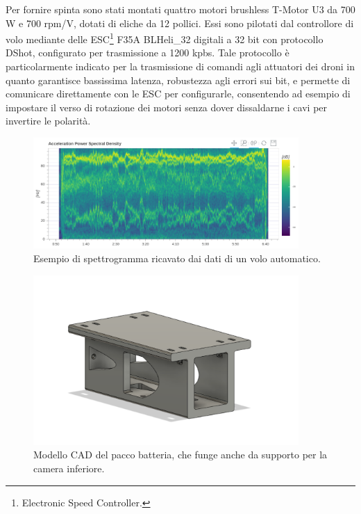 Per fornire spinta sono stati montati quattro motori brushless T-Motor U3 da 700 W e 700 rpm/V, dotati di eliche da 12 pollici. Essi sono pilotati dal controllore di volo mediante delle ESC\footnote{Electronic Speed Controller.} F35A BLHeli\_32 digitali a 32 bit con protocollo DShot, configurato per trasmissione a 1200 kpbs. Tale protocollo è particolarmente indicato per la trasmissione di comandi agli attuatori dei droni in quanto garantisce bassissima latenza, robustezza agli errori sui bit, e permette di comunicare direttamente con le ESC per configurarle, consentendo ad esempio di impostare il verso di rotazione dei motori senza dover dissaldarne i cavi per invertire le polarità.\vfill\clearpage

\begin{figure}
    \centering
    \includegraphics[width=0.9\textwidth]{figs/chapter3/flight_spectro.png}
    \caption{Esempio di spettrogramma ricavato dai dati di un volo automatico.}
    \label{fig:flightspec}
\end{figure}

\begin{figure}
    \centering
    \includegraphics[width=0.9\textwidth]{figs/chapter3/battery-pack.png}
    \caption{Modello CAD del pacco batteria, che funge anche da supporto per la camera inferiore.}
    \label{fig:batpack}
\end{figure}

